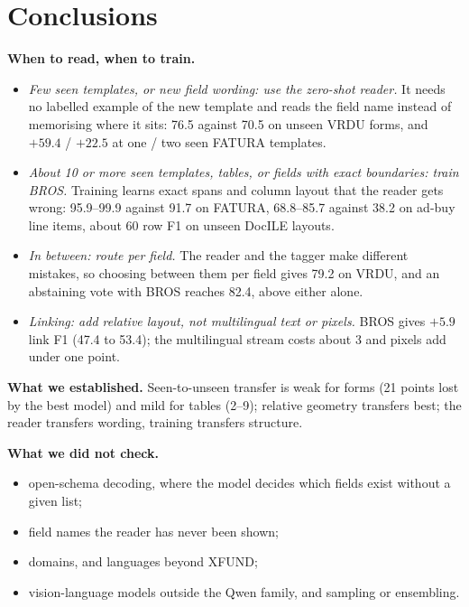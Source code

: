 \documentclass[10pt,a4paper]{article}
\begin{document}
\newpage
\section{Conclusions}
\noindent\textbf{When to read, when to train.}
\begin{itemize}
\item \emph{Few seen templates, or new field wording: use the zero-shot reader.} It needs no labelled example of the new template and reads the field name instead of memorising where it sits: 76.5 against 70.5 on unseen VRDU forms, and $+59.4$ / $+22.5$ at one / two seen FATURA templates.
\item \emph{About 10 or more seen templates, tables, or fields with exact boundaries: train BROS.} Training learns exact spans and column layout that the reader gets wrong: 95.9--99.9 against 91.7 on FATURA, 68.8--85.7 against 38.2 on ad-buy line items, about 60 row F1 on unseen DocILE layouts.
\item \emph{In between: route per field.} The reader and the tagger make different mistakes, so choosing between them per field gives 79.2 on VRDU, and an abstaining vote with BROS reaches 82.4, above either alone.
\item \emph{Linking: add relative layout, not multilingual text or pixels.} BROS gives $+5.9$ link F1 (47.4 to 53.4); the multilingual stream costs about 3 and pixels add under one point.
\end{itemize}
\noindent\textbf{What we established.} Seen-to-unseen transfer is weak for forms (21 points lost by the best model) and mild for tables (2--9); relative geometry transfers best; the reader transfers wording, training transfers structure.

\noindent\textbf{What we did not check.}
\begin{itemize}
\item open-schema decoding, where the model decides which fields exist without a given list;
\item field names the reader has never been shown;
\item domains, and languages beyond XFUND;
\item vision-language models outside the Qwen family, and sampling or ensembling.
\end{itemize}
\end{document}
